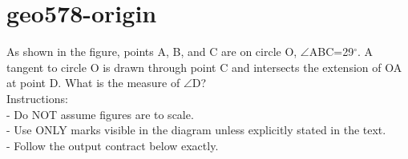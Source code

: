 \documentclass[12pt]{article}
\begin{document}
\section*{geo578-origin}
\noindent\begin{minipage}{\textwidth}
\setlength{\parskip}{4pt}
As shown in the figure, points A, B, and C are on circle O, \ensuremath{\angle }ABC=29\ensuremath{^\circ}. A tangent to circle O is drawn through point C and intersects the extension of OA at point D. What is the measure of \ensuremath{\angle }D?\\
Instructions:\\
- Do NOT assume figures are to scale.\\
- Use ONLY marks visible in the diagram unless explicitly stated in the text.\\
- Follow the output contract below exactly.\\
\end{minipage}
\end{document}
